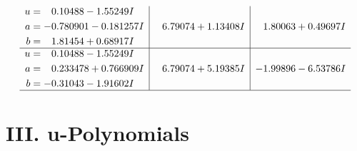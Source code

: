 \documentclass[1p]{elsarticle_modified}
\theoremstyle{definition}
\begin{document}
$$\begin{array}{c|c|c}
\begin{aligned}
u &= \phantom{-}0.10488 - 1.55249 I \\
a &= -0.780901 - 0.181257 I \\
b &= \phantom{-}1.81454 + 0.68917 I\end{aligned}
 & \phantom{-}6.79074 + 1.13408 I & \phantom{-}1.80063 + 0.49697 I \\ \hline\begin{aligned}
u &= \phantom{-}0.10488 - 1.55249 I \\
a &= \phantom{-}0.233478 + 0.766909 I \\
b &= -0.31043 - 1.91602 I\end{aligned}
 & \phantom{-}6.79074 + 5.19385 I & -1.99896 - 6.53786 I\\
 \hline 
 \end{array}$$\newpage
\newpage\renewcommand{\arraystretch}{1}
\centering \section*{ III. u-Polynomials}
\end{document}
